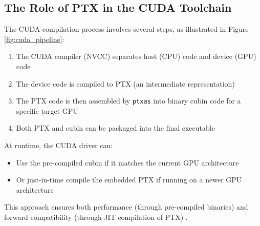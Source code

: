 \subsection{The Role of PTX in the CUDA Toolchain}

The CUDA compilation process involves several steps, as illustrated in Figure \ref{fig:cuda_pipeline}:

\begin{enumerate}
    \item The CUDA compiler (NVCC) separates host (CPU) code and device (GPU) code
    \item The device code is compiled to PTX (an intermediate representation)
    \item The PTX code is then assembled by \texttt{ptxas} into binary cubin code for a specific target GPU
    \item Both PTX and cubin can be packaged into the final executable
\end{enumerate}

At runtime, the CUDA driver can:
\begin{itemize}
    \item Use the pre-compiled cubin if it matches the current GPU architecture
    \item Or just-in-time compile the embedded PTX if running on a newer GPU architecture
\end{itemize}

This approach ensures both performance (through pre-compiled binaries) and forward compatibility (through JIT compilation of PTX) \citep{nvidia_ptx_blog}.



